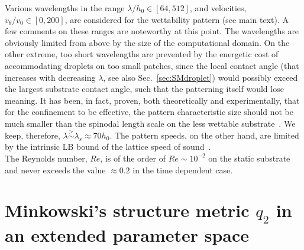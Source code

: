 \documentclass[amsmath,amssymb,showpacs,prf,superscriptaddress,notitlepage,longbibliography]{revtex4-1}
\begin{document}
Various wavelengths in the range $\lambda/h_0 \in [64, 512]$, and velocities, $v_{\theta}/v_0 \in [0, 200]$, are considered for the wettability pattern (see main text). 
A few comments on these ranges are noteworthy at this point. The wavelengths are obviously limited from above by the size of the computational domain. 
On the other extreme, too short wavelengths are prevented by the energetic cost of accommodating droplets on too small patches, since the local contact angle (that increases with decreasing $\lambda$, see also Sec.~\ref{sec:SMdroplet}) would possibly exceed the largest substrate contact angle, such that the patterning itself would lose meaning. 
It has been, in fact, proven, both theoretically and experimentally, that for the confinement to be effective, the pattern characteristic size should not be much smaller than the spinodal length scale on the less wettable substrate~\cite{karguptaMorphologicalSelforganizationDewetting2002,karguptaInstabilityPatternFormation2000,nisatoExcitationSurfaceDeformation1999,karimPhaseSeparationUltrathin1998}.
We keep, therefore, $\lambda \stackrel{>}{\sim} \lambda_s \approx 70 h_0$.
The pattern speeds, on the other hand, are limited by the intrinsic LB bound of the lattice speed of sound~\cite{succiLatticeBoltzmannEquation2001}.\\
The Reynolds number, $Re$, is of the order of $Re \sim 10^{-2}$ on the static substrate and never exceeds the value $\approx 0.2$ in the time dependent case.

\section{Minkowski's structure metric \texorpdfstring{$q_2$}{second metric} in an extended parameter space}\label{sec:SMMinko}
\end{document}
